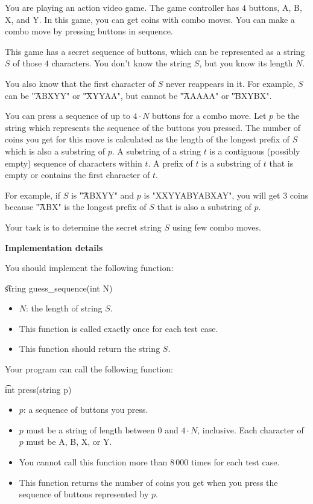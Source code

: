 You are playing an action video game. The game controller has $4$ buttons, A, B, X, and Y. In this game, you can get coins with combo moves. You can make a combo move by pressing buttons in sequence.

This game has a secret sequence of buttons, which can be represented as a string $S$ of those $4$ characters. You don't know the string $S$, but you know its length $N$.

You also know that the first character of $S$ never reappears in it. For example, $S$ can be \t{"ABXYY"} or \t{"XYYAA"}, but cannot be \t{"AAAAA"} or \t{"BXYBX"}.

You can press a sequence of up to $4 \cdot N$ buttons for a combo move. Let $p$ be the string which represents the sequence of the buttons you pressed. The number of coins you get for this move is calculated as the length of the longest prefix of $S$ which is also a substring of $p$. A substring of a string $t$ is a contiguous (possibly empty) sequence of characters within $t$. A prefix of $t$ is a substring of $t$ that is empty or contains the first character of $t$.

For example, if $S$ is \t{"ABXYY"} and $p$ is "XXYYABYABXAY", you will get $3$ coins because \t{"ABX"} is the longest prefix of $S$ that is also a substring of $p$.

Your task is to determine the secret string $S$ using few combo moves.

\bf{Implementation details}

You should implement the following function:

\t{string guess_sequence(int N)}

\begin{itemize}
\item $N$: the length of string $S$.
\item This function is called exactly once for each test case.
\item This function should return the string $S$.
\end{itemize}

Your program can call the following function:

\t{int press(string p)}

\begin{itemize}
\item $p$: a sequence of buttons you press.
\item $p$ must be a string of length between $0$ and $4 \cdot N$, inclusive. Each character of $p$ must be A, B, X, or Y.
\item You cannot call this function more than $8\,000$ times for each test case.
\item This function returns the number of coins you get when you press the sequence of buttons represented by $p$.
\end{itemize}

